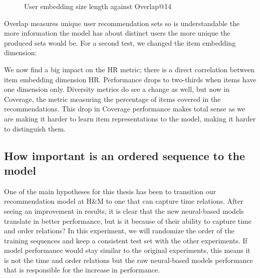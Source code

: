 \documentclass{kththesis}
\begin{document}
\begin{figure}[H]
\centering
{}
\caption{User embedding size length against Overlap@14}
\end{figure}

Overlap measures unique user recommendation sets so is understandable the more information the model has about distinct users the more unique the produced sets would be. For a second test, we changed the item embedding dimension:

\begin{center}

\end{center}

We now find a big impact on the HR metric; there is a direct correlation between item embedding dimension HR. Performance drops to two-thirds when items have one dimension only. Diversity metrics do see a change as well, but now in Coverage, the metric measuring the percentage of items covered in the recommendations. This drop in Coverage performance makes total sense as we are making it harder to learn item representations to the model, making it harder to distinguish them. 


\subsection{How important is an ordered sequence to the model}
One of the main hypotheses for this thesis has been to transition our recommendation model at H\&M to one that can capture time relations. After seeing an improvement in results, it is clear that the new neural-based models translate in better performance, but is it because of their ability to capture time and order relations? In this experiment, we will randomize the order of the training sequences and keep a consistent test set with the other experiments. If model performance would stay similar to the original experiments, this means it is not the time and order relations but the raw neural-based models performance that is responsible for the increase in performance. 
\end{document}
